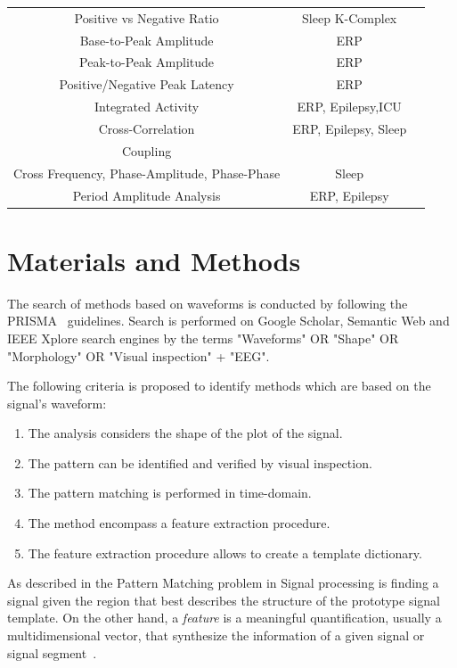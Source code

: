 \documentclass[brainsci,article,submit,moreauthors,pdftex,10pt,a4paper]{mdpi}
\begin{document}
\begin{table}[H]
\begin{tabular}{ccc}
Positive vs Negative Ratio    & Sleep K-Complex &  \citep{EEGIntro} \\
Base-to-Peak Amplitude     & ERP  &  \citep{Cole2017} \\
Peak-to-Peak Amplitude     & ERP  &  \citep{Mak2012} \\
Positive/Negative Peak Latency                                 & ERP  & \citep{Mak2012}  \\
Integrated Activity               & ERP, Epilepsy,ICU & \citep{Uchida1999, Shah2015} \\
Cross-Correlation                & ERP, Epilepsy, Sleep & \citep{Cacioppo2007, Shah2015} \\
Coupling \\ Cross Frequency,  Phase-Amplitude, Phase-Phase     & Sleep & \citep{Cole2017} \\
Period Amplitude Analysis  & ERP, Epilepsy & \citep{Uchida1999,Cacioppo2007, Shah2015} \\
\bottomrule
\end{tabular}
\label{tab:methods}
\end{table}


\section{Materials and Methods}

The search of methods based on waveforms is conducted by following the PRISMA~\citep{Moher2009} guidelines.  Search is performed on Google Scholar, Semantic Web and IEEE Xplore search engines by the terms "Waveforms" OR "Shape" OR "Morphology" OR "Visual inspection" + "EEG".

The following criteria is proposed to identify methods which are based on the signal's waveform:

\begin{enumerate}
\item The analysis considers the shape of the plot of the signal.
\item The pattern can be identified and verified by visual inspection.
\item The pattern matching is performed in time-domain.
\item The method encompass a feature extraction procedure.
\item The feature extraction procedure allows to create a template dictionary.
\end{enumerate}

As described in \citep{allen2004signal} the Pattern Matching problem in Signal processing is finding a signal given the region that best describes the structure of the prototype signal template.   On the other hand, a \textit{feature} is a meaningful quantification, usually a multidimensional vector, that synthesize the information of a given signal or signal segment~\citep{WolpawJonathanR2012}.   
\end{document}
